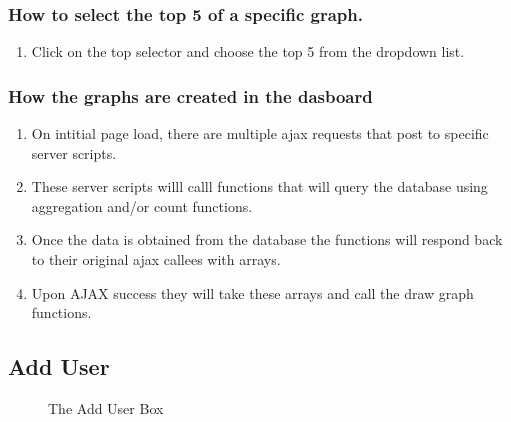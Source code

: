 \documentclass[14pt, a4paper]{article}
\begin{document}
	\subsubsection{How to select the top 5 of a specific graph.}
		\begin{enumerate}
			\item Click on the top selector and choose the top 5 from the dropdown list.
		\end{enumerate}
	\subsubsection{How the graphs are created in the dasboard}
		\begin{enumerate}
			\item On intitial page load, there are multiple ajax requests that post to specific server scripts.
			\item These server scripts willl calll functions that will query the database using aggregation and/or count functions.
			\item Once the data is obtained from the database the functions will respond back to their original ajax callees with arrays.
			\item Upon AJAX success they will take these arrays and call the draw graph functions.
		\end{enumerate}
\subsection{Add User}
	\begin{figure}[H]
		\centerline{}
		\caption{The Add User Box}
		\label{fig:addUser}
	\end{figure}
\end{document}
